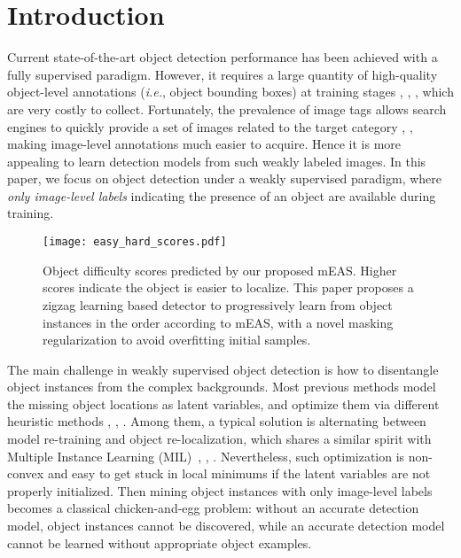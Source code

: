 \documentclass[10pt,twocolumn,letterpaper]{article}
\begin{document}
\section{Introduction}
Current state-of-the-art object detection performance has been achieved with a fully supervised paradigm. However, it requires a large quantity of high-quality object-level annotations (\emph{i.e.}, object bounding boxes) at training stages \cite{girshick2015fast}, \cite{liu2016ssd}, \cite{Redmon_2016_CVPR}, which are very costly to collect. Fortunately, the prevalence of image tags allows search engines to quickly provide a set of images related to the target category \cite{niu2015visual}, \cite{vijayanarasimhan2008keywords}, making image-level annotations much easier to acquire. Hence it is more appealing to learn detection models from such weakly labeled images. In this paper, we focus on object detection under a weakly supervised paradigm, where \emph{only image-level labels} indicating the presence of an object are available during training.

\begin{figure}[t]
  \centering
\texttt{[image: easy\_hard\_scores.pdf]} \\
  \caption{Object difficulty scores predicted by our proposed mEAS. Higher scores indicate the object is easier to localize. This paper proposes a zigzag learning based detector to progressively learn from object instances in the order according to mEAS, with a novel masking regularization to avoid overfitting initial samples.} \label{motivation}
  \vspace{-0.3cm}
\end{figure}

The main challenge in weakly supervised object detection is how to disentangle object instances from the complex backgrounds. Most previous methods model the missing object locations as latent variables, and optimize them via different heuristic methods \cite{li2016image}, \cite{song2014weakly}, \cite{wang2014weakly}. Among them, a typical solution is alternating between model re-training and object re-localization, which shares a similar spirit with Multiple Instance Learning (MIL)~\cite{cinbis2014multi}, \cite{Li_2016_CVPR}, \cite{Tang_2017_CVPR}. Nevertheless, such optimization is non-convex and easy to get stuck in local minimums if the latent variables are not properly initialized. Then mining object instances with only image-level labels becomes a classical chicken-and-egg problem: without an accurate detection model, object instances cannot be discovered, while an accurate detection model cannot be learned without appropriate object examples.
\end{document}
